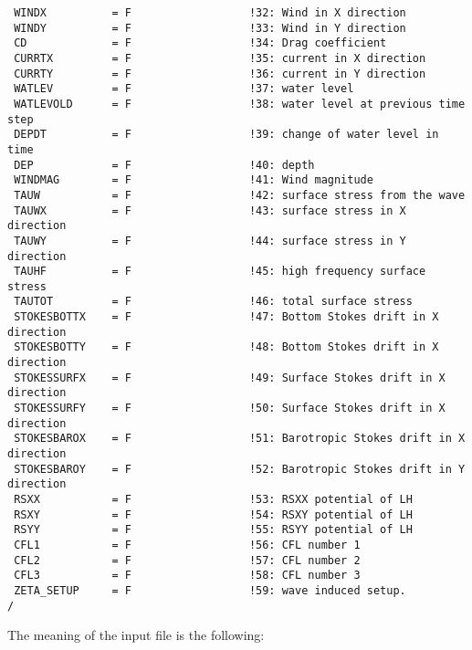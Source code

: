 \documentclass[12pt]{amsart}
\begin{document}
\begin{verbatim}
 WINDX          = F                  !32: Wind in X direction
 WINDY          = F                  !33: Wind in Y direction
 CD             = F                  !34: Drag coefficient
 CURRTX         = F                  !35: current in X direction
 CURRTY         = F                  !36: current in Y direction
 WATLEV         = F                  !37: water level
 WATLEVOLD      = F                  !38: water level at previous time step
 DEPDT          = F                  !39: change of water level in time
 DEP            = F                  !40: depth
 WINDMAG        = F                  !41: Wind magnitude
 TAUW           = F                  !42: surface stress from the wave
 TAUWX          = F                  !43: surface stress in X direction
 TAUWY          = F                  !44: surface stress in Y direction
 TAUHF          = F                  !45: high frequency surface stress
 TAUTOT         = F                  !46: total surface stress
 STOKESBOTTX    = F                  !47: Bottom Stokes drift in X direction
 STOKESBOTTY    = F                  !48: Bottom Stokes drift in X direction
 STOKESSURFX    = F                  !49: Surface Stokes drift in X direction
 STOKESSURFY    = F                  !50: Surface Stokes drift in X direction
 STOKESBAROX    = F                  !51: Barotropic Stokes drift in X direction
 STOKESBAROY    = F                  !52: Barotropic Stokes drift in Y direction
 RSXX           = F                  !53: RSXX potential of LH
 RSXY           = F                  !54: RSXY potential of LH
 RSYY           = F                  !55: RSYY potential of LH
 CFL1           = F                  !56: CFL number 1
 CFL2           = F                  !57: CFL number 2
 CFL3           = F                  !58: CFL number 3
 ZETA_SETUP     = F                  !59: wave induced setup.
/
\end{verbatim}
The meaning of the input file is the following:
\end{document}
